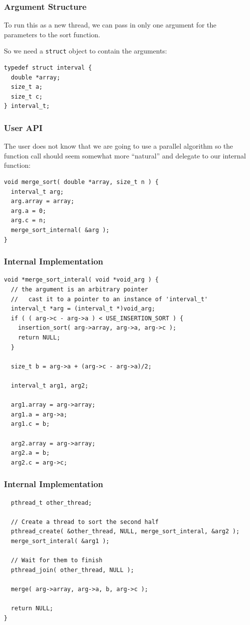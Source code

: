 \begin{frame}[fragile]
\frametitle{Argument Structure}


To run this as a new thread, we can pass in only one argument for the parameters to the sort function. 

So we need a \texttt{struct} object to contain the arguments:

\begin{verbatim}
typedef struct interval {
  double *array;
  size_t a;
  size_t c;
} interval_t;
\end{verbatim}


\end{frame}

\begin{frame}[fragile]
\frametitle{User API}

The user does not know that we are going to use a parallel algorithm so the function call should seem somewhat more ``natural'' and delegate to our internal function: 

\begin{verbatim}
void merge_sort( double *array, size_t n ) {
  interval_t arg;
  arg.array = array;
  arg.a = 0;
  arg.c = n;
  merge_sort_internal( &arg );
}
\end{verbatim}

\end{frame}

\begin{frame}[fragile]
\frametitle{Internal Implementation}

{\scriptsize
\begin{verbatim}
void *merge_sort_interal( void *void_arg ) {
  // the argument is an arbitrary pointer
  //   cast it to a pointer to an instance of 'interval_t'
  interval_t *arg = (interval_t *)void_arg;
  if ( ( arg->c - arg->a ) < USE_INSERTION_SORT ) {
    insertion_sort( arg->array, arg->a, arg->c );
    return NULL;
  }
  
  size_t b = arg->a + (arg->c - arg->a)/2;
  
  interval_t arg1, arg2;
  
  arg1.array = arg->array;
  arg1.a = arg->a;
  arg1.c = b;
  
  arg2.array = arg->array;
  arg2.a = b;
  arg2.c = arg->c;
\end{verbatim}
}
\end{frame}

\begin{frame}[fragile]
\frametitle{Internal Implementation}

{\scriptsize
\begin{verbatim}
  pthread_t other_thread;

  // Create a thread to sort the second half
  pthread_create( &other_thread, NULL, merge_sort_interal, &arg2 ); 
  merge_sort_interal( &arg1 );
  
  // Wait for them to finish
  pthread_join( other_thread, NULL );

  merge( arg->array, arg->a, b, arg->c );

  return NULL;
}
\end{verbatim}
}
\end{frame}

